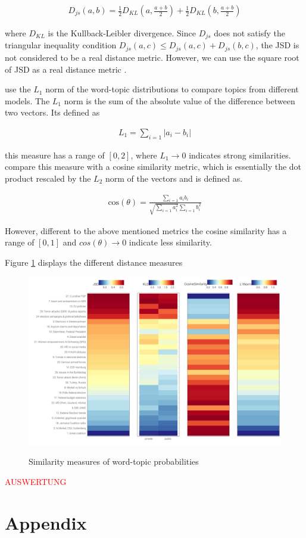 \documentclass[12pt,a4paper,notitlepage]{article}
\begin{document}
\begin{align*}
	D_{js}(a,b)=\frac{1}{2}D_{KL}(a,\frac{a+b}{2})+\frac{1}{2}D_{KL}(b,\frac{a+b}{2})
\end{align*}

where $D_{KL}$ is the Kullback-Leibler divergence. Since $D_{js}$ does not satisfy the triangular inequality condition $D_{js}(a,c)\leq D_{js}(a,c)+D_{js}(b,c)$, the JSD is not considered to be a real distance metric. However, we can use the square root of JSD as a real distance metric \citep{endres_new_2003}.

\citet{roberts_navigating_2016} use the $L_1$ norm of the word-topic distributions to compare topics from different models. The $L_1$ norm is the sum of the absolute value of the difference between two vectors. Its defined as

\begin{align*}
	L_1=\sum_{i=1} |a_i-b_i|
\end{align*}

this measure has a range of $[0,2]$, where $ L_1 \to 0$ indicates strong similarities. \citet{roberts_navigating_2016} compare this measure with a cosine similarity metric, which is essentially the dot product rescaled by the $L_2$ norm of the vectors and is defined as.

\begin{align*}
	\text{cos}(\theta)=\frac{\sum_{i=1}a_i b_i}{\sqrt{\sum_{i=1}a_i^2}\sum_{i=1}b_i^2}
\end{align*}

However, different to the above mentioned metrics the cosine similarity has a range of $[0,1]$ and $cos(\theta) \to 0$ indicate less similarity.

Figure \ref{fig_distance} displays the different distance measures 

\begin{figure}[H]
	\begin{center}
		\caption{Similarity measures of word-topic probabilities}
		\includegraphics[width=\textwidth,keepaspectratio]{../figs/distance}
		\label{fig_distance}
	\end{center}
\end{figure}

\textcolor{red}{AUSWERTUNG}

\section*{Appendix}
\end{document}
